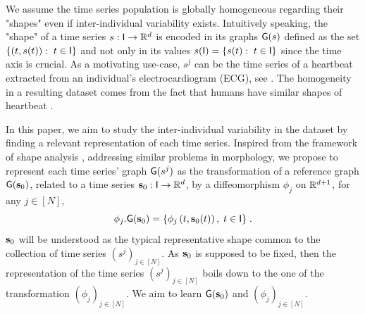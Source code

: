  We assume the time series population is globally homogeneous regarding their "shapes" even if inter-individual variability exists.
 Intuitively speaking, the "shape" of a time series $s:\mathsf{I}\to \mathbb{R}^d$ is encoded in its graphs $\mathsf{G}(s)$ defined as the set $\{(t,s(t)):\; t\in\mathsf{I} \} $ and not only in its values $s(\mathsf{I})=\{s(t):\; t\in\mathsf{I} \} $ since the time axis is crucial. %
 As a motivating use-case, $s^j$ can be the time series of a heartbeat extracted from an individual's electrocardiogram (ECG), see .
 The homogeneity in a resulting dataset comes from the fact that humans have similar shapes of heartbeat \cite{ye2012heartbeat,madona2021pqrst}.

In this paper, we aim to study the inter-individual variability in the dataset by finding a relevant representation of each time series.
Inspired from the framework of shape analysis \cite{vaillant2004statistics}, addressing similar problems in morphology,
 we propose to represent each time series' graph $\mathsf{G}(s^j)$ as the transformation of a reference graph $\mathsf{G}(\mathbf{s}_0)$, related to a time series $\mathbf{s}_0:\mathsf{I} \to\mathbb{R}^d$, by a diffeomorphism $\phi_j$ on $\mathbb{R}^{d+1}$, for any $j\in[N]$,
\begin{equation}
 \label{eq:transformation}
 \phi_j.\mathsf{G}(\mathbf{s}_0)=\{\phi_j\left(t,\mathbf{s}_0(t)\right), \; t\in \mathsf{I} \} \;.
\end{equation}
$\mathbf{s}_0$ will be understood as the typical representative shape common to the collection of time series $(s^j)_{j\in[N]}$.
As $\mathbf{s}_0$ is supposed to be fixed, then the representation of the time series $(s^j)_{j\in[N]}$ boils down to the one of the transformation $(\phi_j)_{j\in[N]}$.
We aim to learn $\mathsf{G}(\mathbf{s}_0)$ and $(\phi_j)_{j\in[N]} $. 

